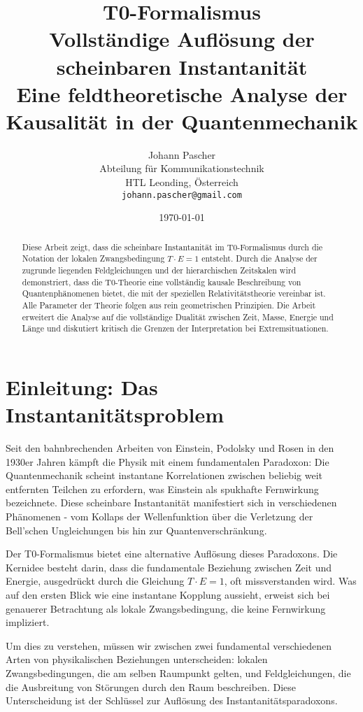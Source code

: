 \documentclass[12pt,a4paper]{article}
\title{{\Huge \color{t0blue}T0-Formalismus}\\
	{\LARGE Vollständige Auflösung der scheinbaren Instantanität}\\
	\vspace{1cm}
	{\Large Eine feldtheoretische Analyse der Kausalität in der Quantenmechanik}}
\author{{\Large Johann Pascher}\\
	Abteilung für Kommunikationstechnik\\
	HTL Leonding, Österreich\\
	\texttt{johann.pascher@gmail.com}}
\date{\today}
\begin{document}
	
	\maketitle
	\thispagestyle{empty}
	
	\begin{abstract}
		Diese Arbeit zeigt, dass die scheinbare Instantanität im T0-Formalismus durch die Notation der lokalen Zwangsbedingung $T \cdot E = 1$ entsteht. Durch die Analyse der zugrunde liegenden Feldgleichungen und der hierarchischen Zeitskalen wird demonstriert, dass die T0-Theorie eine vollständig kausale Beschreibung von Quantenphänomenen bietet, die mit der speziellen Relativitätstheorie vereinbar ist. Alle Parameter der Theorie folgen aus rein geometrischen Prinzipien. Die Arbeit erweitert die Analyse auf die vollständige Dualität zwischen Zeit, Masse, Energie und Länge und diskutiert kritisch die Grenzen der Interpretation bei Extremsituationen.
	\end{abstract}
	
	\newpage
	\hypersetup{linkcolor=blue}
	\tableofcontents
	\newpage
	
	\section{Einleitung: Das Instantanitätsproblem}
	
	Seit den bahnbrechenden Arbeiten von Einstein, Podolsky und Rosen in den 1930er Jahren kämpft die Physik mit einem fundamentalen Paradoxon: Die Quantenmechanik scheint instantane Korrelationen zwischen beliebig weit entfernten Teilchen zu erfordern, was Einstein als spukhafte Fernwirkung bezeichnete. Diese scheinbare Instantanität manifestiert sich in verschiedenen Phänomenen - vom Kollaps der Wellenfunktion über die Verletzung der Bell'schen Ungleichungen bis hin zur Quantenverschränkung.
	
	Der T0-Formalismus bietet eine alternative Auflösung dieses Paradoxons. Die Kernidee besteht darin, dass die fundamentale Beziehung zwischen Zeit und Energie, ausgedrückt durch die Gleichung $T \cdot E = 1$, oft missverstanden wird. Was auf den ersten Blick wie eine instantane Kopplung aussieht, erweist sich bei genauerer Betrachtung als lokale Zwangsbedingung, die keine Fernwirkung impliziert.
	
	Um dies zu verstehen, müssen wir zwischen zwei fundamental verschiedenen Arten von physikalischen Beziehungen unterscheiden: lokalen Zwangsbedingungen, die am selben Raumpunkt gelten, und Feldgleichungen, die die Ausbreitung von Störungen durch den Raum beschreiben. Diese Unterscheidung ist der Schlüssel zur Auflösung des Instantanitätsparadoxons.
	
\end{document}

